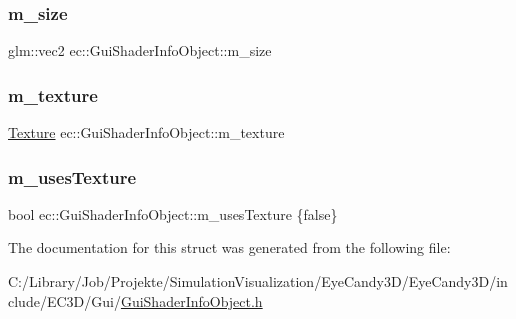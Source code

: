 \subsubsection{\texorpdfstring{m\+\_\+size}{m\_size}}
{\footnotesize\ttfamily glm\+::vec2 ec\+::\+Gui\+Shader\+Info\+Object\+::m\+\_\+size}

\mbox{\label{structec_1_1_gui_shader_info_object_a80f6058638a7da161d3f30cdb771355c}} 
\subsubsection{\texorpdfstring{m\+\_\+texture}{m\_texture}}
{\footnotesize\ttfamily \mbox{\hyperlink{classec_1_1_texture}{Texture}} ec\+::\+Gui\+Shader\+Info\+Object\+::m\+\_\+texture}

\mbox{\label{structec_1_1_gui_shader_info_object_af9f670fe1830664d40f9f9349be47ac5}} 
\subsubsection{\texorpdfstring{m\+\_\+uses\+Texture}{m\_usesTexture}}
{\footnotesize\ttfamily bool ec\+::\+Gui\+Shader\+Info\+Object\+::m\+\_\+uses\+Texture \{false\}}



The documentation for this struct was generated from the following file\+:\begin{DoxyCompactItemize}
\item 
C\+:/\+Library/\+Job/\+Projekte/\+Simulation\+Visualization/\+Eye\+Candy3\+D/\+Eye\+Candy3\+D/include/\+E\+C3\+D/\+Gui/\mbox{\hyperlink{_gui_shader_info_object_8h}{Gui\+Shader\+Info\+Object.\+h}}\end{DoxyCompactItemize}
